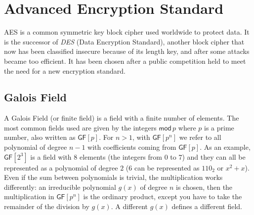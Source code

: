 \section{Advanced Encryption Standard}
AES is a common symmetric key block cipher used worldwide to protect data. It is the successor of \emph{DES} (Data Encryption Standard), another block cipher that now has been classified insecure because of its length key, and after some attacks became too efficient. It has been chosen after a public competition held to meet the need for a new encryption standard.\\

\subsection{Galois Field}
A Galois Field (or finite field) is a field with a finite number of elements. The most common fields used are given by the integers $\mathsf{mod}\,p$ where $p$ is a prime number, also written as $\mathsf{GF}[p]$. For $n > 1$, with $\mathsf{GF}[p^n]$ we refer to all polynomial of degree $n-1$ with coefficients coming from $\mathsf{GF}[p]$. As an example, $\mathsf{GF}[2^3]$ is a field with $8$ elements (the integers from 0 to 7) and they can all be represented as a polynomial of degree $2$ (6 can be represented as $110_2$ or $x^2+x$).\\
Even if the sum between polynomials is trivial, the multiplication works differently: an irreducible polynomial $g(x)$ of degree $n$ is chosen, then the multiplication in $\mathsf{GF}[p^n]$ is the ordinary product, except you have to take the remainder of the division by $g(x)$. A different $g(x)$ defines a different field.

